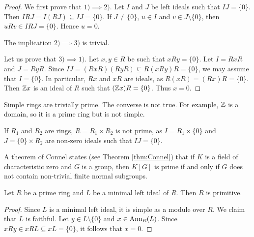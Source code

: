 \begin{proof}
	We first prove that $1)\implies2)$. Let $I$ and $J$ be left ideals such that
	$IJ=\{0\}$. Then $IRJ=I(RJ)\subseteq IJ=\{0\}$. If $J\ne
	\{0\}$, $u\in I$ and $v\in J\setminus\{0\}$, then $uRv\in IRJ=\{0\}$. Hence 
	$u=0$.

	The implication $2)\implies3)$ is trivial. 

    Let us prove that $3)\implies1)$. Let $x,y\in R$ be such that $xRy=\{0\}$.
	Let $I=RxR$ and $J=RyR$. Since $IJ=(RxR)(RyR)\subseteq R(xRy)R=\{0\}$, 
	we may assume that $I=\{0\}$. In particular, $Rx$ and $xR$ are ideals, as 
	$R(xR)=(Rx)R=\{0\}$. Then $\mathbb{Z} x$ is an ideal of $R$ such that $(\mathbb{Z} x)R=\{0\}$. 
	Thus $x=0$. 
\end{proof}

Simple rings are trivially prime. The converse is not true. For example,
$\mathbb{Z}$ is a domain, so it is a prime ring but is not simple.

\begin{example}
	If $R_1$ and $R_2$ are rings, $R=R_1\times R_2$ is not prime, as 
	$I=R_1\times\{0\}$ and $J=\{0\}\times R_2$ are non-zero ideals such that $IJ=\{0\}$.
\end{example}

A theorem of Connel states (see Theorem \ref{thm:Connel}) that 
if $K$ is a field of characteristic zero and $G$ 
is a group, then $K[G]$ is prime if and only if 
$G$ does not contain non-trivial finite normal subgroups. 



\begin{lemma}
	\label{lem:primoizqmin=>prim}
	Let $R$ be a prime ring and $L$ be a minimal left ideal of $R$.
	Then $R$ is primitive. 
\end{lemma}

\begin{proof}
	Since $L$ is a minimal left ideal, it is simple as a module over $R$. 
	We claim that $L$ is faithful. Let $y\in L\setminus\{0\}$ and
	$x\in\operatorname{Ann}_R(L)$. Since $xRy\in xRL\subseteq xL=\{0\}$, it follows that 
	$x=0$.
\end{proof}

